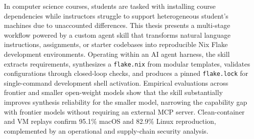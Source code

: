 \begin{center}
	\MakeUppercase\ThesisTitle
\end{center}
\doublespacing
\begin{center}
	\AuthorName
\end{center}
\setlength{\parindent}{0in}

In computer science courses, students are tasked with installing course dependencies while instructors struggle to support heterogeneous student's machines due to unaccounted differences. This thesis presents a multi-stage workflow powered by a custom agent skill that transforms natural language instructions, assignments, or starter codebases into reproducible Nix Flake development environments. Operating within an AI agent harness, the skill extracts requirements, synthesizes a \texttt{flake.nix} from modular templates, validates configurations through closed-loop checks, and produces a pinned \texttt{flake.lock} for single-command development shell activation. Empirical evaluations across frontier and smaller open-weight models show that the skill substantially improves synthesis reliability for the smaller model, narrowing the capability gap with frontier models without requiring an external MCP server. Clean-container and VM replays confirm 95.1\% macOS and 82.9\% Linux reproduction, complemented by an operational and supply-chain security analysis.

